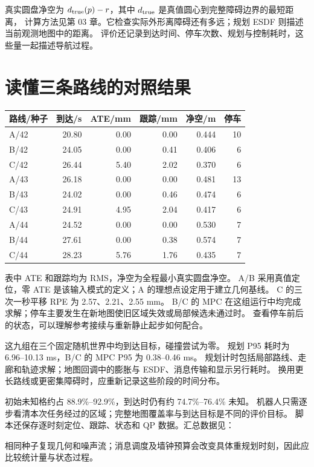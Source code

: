 真实圆盘净空为 $d_{\rm true}(p)-r$，其中 $d_{\rm true}$ 是真值圆心到完整障碍边界的最短距离，
计算方法见第 03 章。它检查实际外形离障碍还有多远；规划 ESDF 则描述当前观测地图中的距离。
评价还记录到达时间、停车次数、规划与控制耗时，这些量一起描述导航过程。

\section{读懂三条路线的对照结果}
\begin{center}\small
\begin{tabular}{lrrrrr}\toprule
路线/种子 & 到达/s & ATE/mm & 跟踪/mm & 净空/m & 停车\\\midrule
A/42 & 20.80 & 0.00 & 0.00 & 0.444 & 10\\
B/42 & 24.05 & 0.00 & 0.41 & 0.406 & 6\\
C/42 & 26.44 & 5.40 & 2.02 & 0.370 & 6\\
A/43 & 26.18 & 0.00 & 0.00 & 0.481 & 13\\
B/43 & 24.02 & 0.00 & 0.46 & 0.474 & 6\\
C/43 & 24.91 & 4.95 & 2.04 & 0.417 & 6\\
A/44 & 24.52 & 0.00 & 0.00 & 0.530 & 7\\
B/44 & 27.61 & 0.00 & 0.38 & 0.574 & 7\\
C/44 & 28.23 & 5.76 & 1.76 & 0.435 & 7\\
\bottomrule\end{tabular}
\end{center}
表中 ATE 和跟踪均为 RMS，净空为全程最小真实圆盘净空。
A/B 采用真值定位，零 ATE 是该输入模式的定义；A 的理想点设定用于建立几何基线。
C 的三次一秒平移 RPE 为 2.57、2.21、2.55 mm。
B/C 的 MPC 在这组运行中均完成求解；停车主要发生在新地图使旧区域失效或局部候选未通过时。
查看停车前后的状态，可以理解参考接续与重新静止起步如何配合。

这九组在三个固定随机世界中均到达目标，碰撞尝试为零。
规划 P95 耗时为 6.96--10.13 ms，B/C 的 MPC P95 为 0.38--0.46 ms。
规划计时包括局部路线、走廊和轨迹求解；地图回调中的膨胀与 ESDF、消息传输和显示另行耗时。
换用更长路线或更密集障碍时，应重新记录这些阶段的时间分布。

初始未知格约占 88.9\%--92.9\%，到达时仍有约 74.7\%--76.4\% 未知。
机器人只需逐步看清本次任务经过的区域；完整地图覆盖率与到达目标是不同的评价目标。
脚本还保存逐时刻定位、跟踪、状态和 QP 数据。汇总数据见：
\begin{center}\end{center}
相同种子复现几何和噪声流；消息调度及墙钟预算会改变具体重规划时刻，因此应比较统计量与状态过程。

